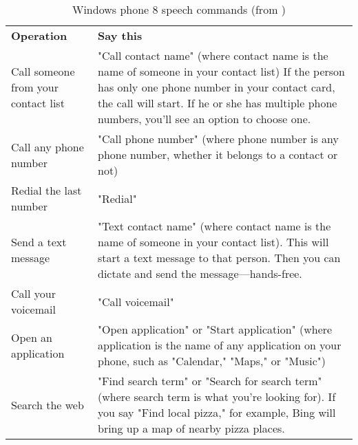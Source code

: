 \begin{table}[htbp]
  \centering
  \caption{Windows phone 8 speech commands (from \cite{wp8voice})}\label{tab:w8sc}
  \renewcommand{\arraystretch}{1.2}
    \begin{tabularx}{\textwidth}{p{3cm}|X}
    \rowcolor{mygray}
    \textbf{Operation}  & \textbf{Say this} \\
    Call someone from your contact list & "Call contact name" 
           (where contact name is the name of someone in your contact list) 
           If the person has only one phone number in your contact card, the call will start. If he or she has multiple phone numbers, you'll see an option to choose one. \\ \hline
    Call any phone number & "Call phone number" (where phone number is any phone number, whether it belongs to a contact or not)\\ \hline
     Redial the last number & "Redial" \\ \hline
    Send a text message & "Text contact name" (where contact name is the name of someone in your contact list). This will start a text message to that person. Then you can dictate and send the message—hands-free. \\ \hline
    Call your voicemail & "Call voicemail" \\ \hline
    Open an application & "Open application" or "Start application" (where application is the name of any application on your phone, such as "Calendar," "Maps," or "Music") \\ \hline
    Search the web & "Find search term" or "Search for search term" (where search term is what you're looking for). If you say "Find local pizza," for example, Bing will bring up a map of nearby pizza places. \\ \end{tabularx}
\end{table}%
